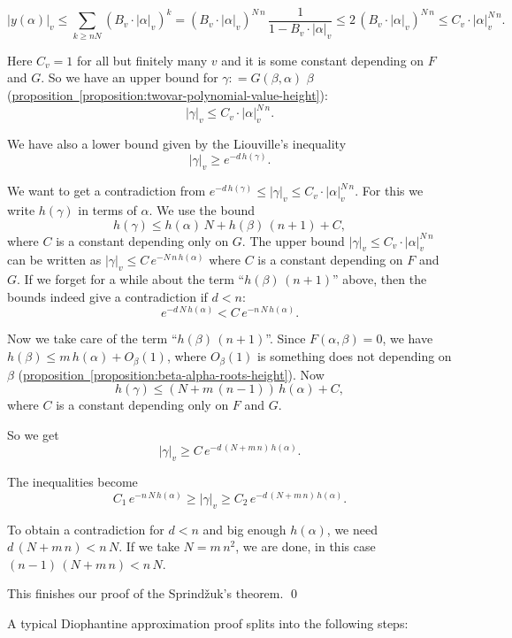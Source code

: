 \documentclass{article}
\newcommand{\dfn}{\mathrel{\mathop:}=}
\newcommand{\refref}[2]{\hyperref[#2]{#1~\ref*{#2}}}
\theoremstyle{myplain}
\theoremstyle{mydefinition}
\begin{document}
\[ |y (\alpha)|_v \le \sum_{k \ge n N} (B_v \cdot |\alpha|_v)^k =
  (B_v \cdot |\alpha|_v)^{N\,n} \, \frac{1}{1 - B_v \cdot |\alpha|_v} \le
  2 \, (B_v \cdot |\alpha|_v)^{N\,n} \le
  C_v \cdot |\alpha|_v^{N\,n}. \]

Here $C_v = 1$ for all but finitely many $v$ and it is some constant depending
on $F$ and $G$. So we have an upper bound for $\gamma \dfn G (\beta,\alpha)$
$\beta$ (\refref{proposition}{proposition:twovar-polynomial-value-height}):
\[ |\gamma|_v \le C_v \cdot |\alpha|_v^{N\,n}. \]

We have also a lower bound given by the Liouville's inequality
\[ |\gamma|_v \ge e^{-d \, h (\gamma)}. \]

We want to get a contradiction from
$e^{-d \, h (\gamma)} \le |\gamma|_v \le C_v \cdot |\alpha|_v^{N\,n}$. For this
we write $h (\gamma)$ in terms of $\alpha$. We use the bound
$$h (\gamma) \le h (\alpha) \, N + h (\beta) \, (n+1) + C,$$
where $C$ is a constant depending only on $G$. The upper bound
$|\gamma|_v \le C_v \cdot |\alpha|_v^{N\,n}$ can be written as
$|\gamma|_v \le C\, e^{-N\,n\,h(\alpha)}$ where $C$ is a constant depending on
$F$ and $G$. If we forget for a while about the term ``$h (\beta) \, (n+1)$''
above, then the bounds indeed give a contradiction if $d < n$:
$$e^{-d \, N \, h (\alpha)} < C \, e^{-n \, N \, h (\alpha)}.$$

Now we take care of the term ``$h (\beta) \, (n+1)$''. Since
$F (\alpha,\beta) = 0$, we have $h (\beta) \le m \, h (\alpha) + O_\beta (1)$,
where $O_\beta (1)$ is something does not depending on $\beta$
(\refref{proposition}{proposition:beta-alpha-roots-height}). Now
$$h (\gamma) \le (N + m \, (n-1)) \, h (\alpha) + C,$$
where $C$ is a constant depending only on $F$ and $G$.

So we get
$$|\gamma|_v \ge C \, e^{-d \, (N + m\,n) \, h (\alpha)}.$$

The inequalities become
\[ C_1 \, e^{-n\,N\,h(\alpha)} \ge |\gamma|_v \ge
  C_2 \, e^{-d \, (N + m\,n) \, h (\alpha)}. \]

To obtain a contradiction for $d < n$ and big enough $h (\alpha)$, we need
$d \, (N + m\,n) < n\,N$. If we take $N = m\,n^2$, we are done, in this case
$(n-1) \, (N + m\,n) < n\,N$.

This finishes our proof of the Sprind\v{z}uk's theorem. \qed

\vspace{1em}

A typical Diophantine approximation proof splits into the following steps:
\end{document}
